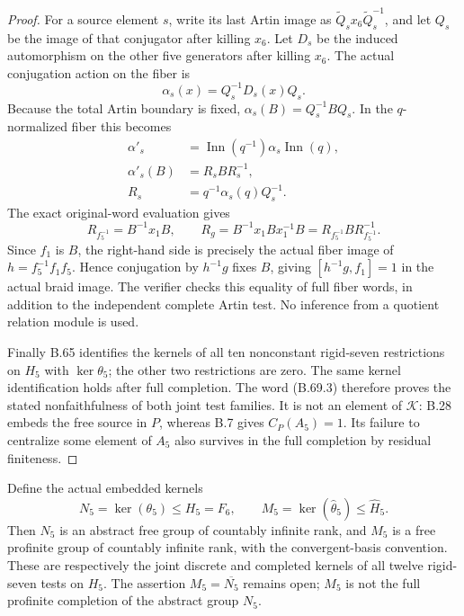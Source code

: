\begin{proof}
For a source element $s$, write its last Artin image
as $\widetilde Q_s x_6\widetilde Q_s^{-1}$, and let
$Q_s$ be the image of that conjugator after killing $x_6$.
Let $D_s$ be the induced automorphism
on the other five generators after killing $x_6$.
The actual conjugation action on the fiber is
\[
 \alpha_s(x)=Q_s^{-1}D_s(x)Q_s.
\]
Because the total Artin boundary is fixed,
$\alpha_s(B)=Q_s^{-1}BQ_s$.
In the $q$-normalized fiber this becomes
\[
 \begin{split}
  \alpha'_s&=\operatorname{Inn}(q^{-1})\alpha_s
                                  \operatorname{Inn}(q),\\
  \alpha'_s(B)&=R_sBR_s^{-1},\\
  R_s&=q^{-1}\alpha_s(q)Q_s^{-1}.
 \end{split}                                                    \tag{B.69.6}
\]
The exact original-word evaluation gives
\[
 R_{f_5^{-1}}=B^{-1}x_1B,
 \qquad R_g=B^{-1}x_1Bx_1^{-1}B
                   =R_{f_5^{-1}}BR_{f_5^{-1}}^{-1}.            \tag{B.69.7}
\]
Since $f_1$ is $B$, the right-hand side is precisely
the actual fiber image of $h=f_5^{-1}f_1f_5$.
Hence conjugation by $h^{-1}g$ fixes $B$, giving
$[h^{-1}g,f_1]=1$ in the actual braid image.
The verifier checks this equality of full fiber words,
in addition to the independent complete Artin test.
No inference from a quotient relation module is used.

Finally B.65 identifies the kernels of all ten nonconstant
rigid-seven restrictions on $H_5$ with $\ker\theta_5$;
the other two restrictions are zero.  The same kernel
identification holds after full completion.  The word
(B.69.3) therefore proves the stated nonfaithfulness
of both joint test families.
It is not an element of $\mathcal K$: B.28 embeds the
free source in $P$, whereas B.7 gives $C_P(A_5)=1$.
Its failure to centralize some element of $A_5$ also
survives in the full completion by residual finiteness.
\end{proof}

Define the actual embedded kernels
\[
       N_5=\ker(\theta_5)\leq H_5=F_6,
       \qquad
       M_5=\ker(\widehat\theta_5)\leq\widehat H_5.
                                                               \tag{B.70.1}
\]
Then $N_5$ is an abstract free group of countably infinite
rank, and $M_5$ is a free profinite group of countably
infinite rank, with the convergent-basis convention.
These are respectively the joint discrete and completed
kernels of all twelve rigid-seven tests on $H_5$.
The assertion $M_5=\overline{N_5}$ remains open;
$M_5$ is not the full profinite completion of the
abstract group $N_5$.

